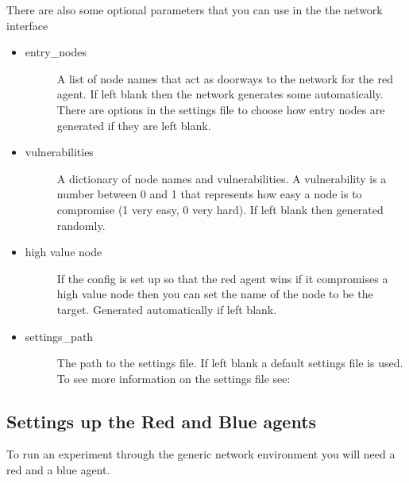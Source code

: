 \documentclass[letterpaper,10pt,english]{sphinxmanual}
\begin{document}
\sphinxAtStartPar
There are also some optional parameters that you can use in the the network interface
\begin{itemize}
\item {} \begin{description}
\item[{entry\_nodes}] \leavevmode
\sphinxAtStartPar
A list of node names that act as doorways to the network for the red agent. If left
blank then the network generates some automatically. There are options in the settings
file to choose how entry nodes are generated if they are left blank.

\end{description}

\item {} \begin{description}
\item[{vulnerabilities}] \leavevmode
\sphinxAtStartPar
A dictionary of node names and vulnerabilities. A vulnerability is a number between 0 and 1
that represents how easy a node is to compromise (1 very easy, 0 very hard). If left
blank then generated randomly.

\end{description}

\item {} \begin{description}
\item[{high value node}] \leavevmode
\sphinxAtStartPar
If the config is set up so that the red agent wins if it compromises a high value
node then you can set the name of the node to be the target. Generated automatically
if left blank.

\end{description}

\item {} \begin{description}
\item[{settings\_path}] \leavevmode
\sphinxAtStartPar
The path to the settings file. If left blank a default settings file is used. To see
more information on the settings file see: {\hyperref[\detokenize{source/config_file:config-file}]{}}

\end{description}

\end{itemize}


\subsection{Settings up the Red and Blue agents}
\label{\detokenize{source/getting_started:settings-up-the-red-and-blue-agents}}
\sphinxAtStartPar
To run an experiment through the generic network environment you will need a red and a
blue agent.
\end{document}
